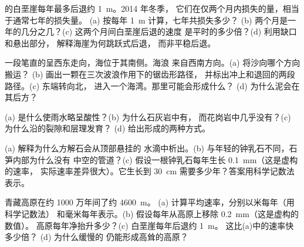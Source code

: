 \begin{exercise}[$\star\star$]\label{exo:g9:landforms:6}
的白垩崖每年最多后退约 \qty{1}{m}。2014 年冬季，
它们在仅两个月内损失的量，相当于通常七年的损失量。
(a) 按每年 \qty{1}{m} 计算，七年共损失多少？
(b) 两个月是一年的几分之几？(c) 这两个月间白垩崖后退的速度
是平时的多少倍？(d) 利用缺口和悬出部分，
解释海崖为何跳跃式后退，
而非平稳后退。
\end{exercise}

\begin{exercise}[$\star\star$]\label{exo:g9:landforms:7}
一段笔直的呈西东走向，海位于其南侧。海浪
来自西南方向。(a) 将沙向哪个方向搬运？
(b) 画出一颗在三次波浪作用下的锯齿形路径，
并标出冲上和退回的两段路径。(c) 东端转向北，
进入一个海湾。那里可能会形成什么？
(d) 为什么泥会在其后方？
\end{exercise}

\begin{exercise}[$\star\star$]\label{exo:g9:landforms:8}
(a) 是什么使雨水略呈酸性？(b) 为什么石灰岩中有，
而花岗岩中几乎没有？(c) 为什么沿的裂隙和层理发育？
(d) 给出形成的两种方式。
\end{exercise}

\begin{exercise}[$\star\star$]\label{exo:g9:landforms:9}
(a) 解释为什么方解石会从顶部悬挂的
水滴中析出。(b) 与年轻的钟乳石不同，石笋内部为什么没有
中空的管道？(c) 假设一根钟乳石每年生长 \qty{0.1}{mm}（这是虚构的速率，
实际速率差异很大）。它生长到
\qty{30}{cm} 需要多少年？答案用科学记数法表示。
\end{exercise}

\begin{exercise}[$\star\star$]\label{exo:g9:landforms:10}
青藏高原在约 1000 万年间了约 \qty{4600}{m}。
(a) 计算平均速率，分别以米每年（用科学记数法）
和毫米每年表示。(b) 假设每年从高原上移除 \qty{0.2}{mm}（这是虚构的数值）。
高原每年净抬升多少？(c) 白垩崖每年后退约 \qty{1}{m}。
这比(a)中的速率快多少倍？
(d) 为什么缓慢的
仍能形成高耸的高原？
\end{exercise}

